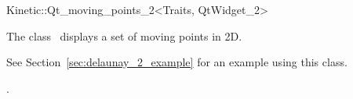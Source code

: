 

\begin{ccRefClass}{Kinetic::Qt_moving_points_2<Traits, QtWidget_2>}  %


\ccDefinition
  
The class \ccRefName\ displays a set of moving points in 2D.

See Section~\ref{sec:delaunay_2_example} for an example using this class. 





\ccCreation
{}  %



\ccSeeAlso

.

\end{ccRefClass}


